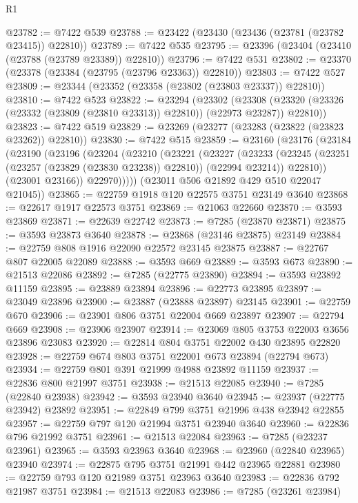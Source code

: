 \begin{lexlean}{R1}
\begin{coremodule}
@23782 := @7422 @539
@23788 := @23422 (@23430 (@23436 (@23781 (@23782 @23415)) @22810))
@23789 := @7422 @535
@23795 := @23396 (@23404 (@23410 (@23788 (@23789 @23389)) @22810))
@23796 := @7422 @531
@23802 := @23370 (@23378 (@23384 (@23795 (@23796 @23363)) @22810))
@23803 := @7422 @527
@23809 := @23344 (@23352 (@23358 (@23802 (@23803 @23337)) @22810))
@23810 := @7422 @523
@23822 := @23294
    (@23302
      (@23308 (@23320 (@23326 (@23332 (@23809 (@23810 @23313)) @22810)) (@22973 @23287)) @22810))
@23823 := @7422 @519
@23829 := @23269 (@23277 (@23283 (@23822 (@23823 @23262)) @22810))
@23830 := @7422 @515
@23859 := @23160
    (@23176
      (@23184
        (@23190
          (@23196
            (@23204
              (@23210
                (@23221
                  (@23227
                    (@23233
                      (@23245 (@23251 (@23257 (@23829 (@23830 @23238)) @22810)) (@22994 @23214))
                      @22810))
                  (@23001 @23166))
                @22970)))))
      (@23011 @506 @21892 @429 @510 @22047 @21045))
@23865 := @22759 @1918 @120 @22575 @3751 @23149 @3640
@23868 := @22617 @1917 @22573 @3751
@23869 := @21063 @22660
@23870 := @3593 @23869
@23871 := @22639 @22742
@23873 := @7285 (@23870 @23871)
@23875 := @3593 @23873 @3640
@23878 := @23868 (@23146 @23875) @23149
@23884 := @22759 @808 @1916 @22090 @22572 @23145 @23875
@23887 := @22767 @807 @22005 @22089
@23888 := @3593 @669
@23889 := @3593 @673
@23890 := @21513 @22086
@23892 := @7285 (@22775 @23890)
@23894 := @3593 @23892 @11159
@23895 := @23889 @23894
@23896 := @22773 @23895
@23897 := @23049 @23896
@23900 := @23887 (@23888 @23897) @23145
@23901 := @22759 @670
@23906 := @23901 @806 @3751 @22004 @669 @23897
@23907 := @22794 @669
@23908 := @23906 @23907
@23914 := @23069 @805 @3753 @22003 @3656 @23896 @23083
@23920 := @22814 @804 @3751 @22002 @430 @23895 @22820
@23928 := @22759 @674 @803 @3751 @22001 @673 @23894 (@22794 @673)
@23934 := @22759 @801 @391 @21999 @4988 @23892 @11159
@23937 := @22836 @800 @21997 @3751
@23938 := @21513 @22085
@23940 := @7285 (@22840 @23938)
@23942 := @3593 @23940 @3640
@23945 := @23937 (@22775 @23942) @23892
@23951 := @22849 @799 @3751 @21996 @438 @23942 @22855
@23957 := @22759 @797 @120 @21994 @3751 @23940 @3640
@23960 := @22836 @796 @21992 @3751
@23961 := @21513 @22084
@23963 := @7285 (@23237 @23961)
@23965 := @3593 @23963 @3640
@23968 := @23960 (@22840 @23965) @23940
@23974 := @22875 @795 @3751 @21991 @442 @23965 @22881
@23980 := @22759 @793 @120 @21989 @3751 @23963 @3640
@23983 := @22836 @792 @21987 @3751
@23984 := @21513 @22083
@23986 := @7285 (@23261 @23984)

\end{coremodule}
\end{lexlean}
